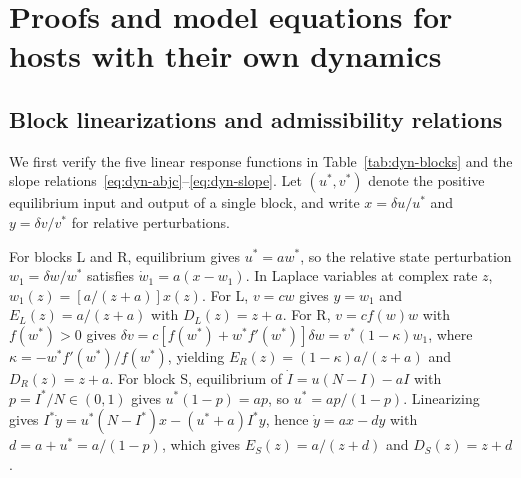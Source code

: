 \section{Proofs and model equations for hosts with their own dynamics}\label{app:dyn}

\subsection{Block linearizations and admissibility relations}\label{subsec:app-dyn-blocks}

We first verify the five linear response functions in Table~\ref{tab:dyn-blocks} and the slope relations~\eqref{eq:dyn-abjc}--\eqref{eq:dyn-slope}. Let $(u^*, v^*)$ denote the positive equilibrium input and output of a single block, and write $x = \delta u / u^*$ and $y = \delta v / v^*$ for relative perturbations.

For blocks L and R, equilibrium gives $u^* = a w^*$, so the relative state perturbation $w_1 = \delta w / w^*$ satisfies $\dot{w}_1 = a(x - w_1)$. In Laplace variables at complex rate $z$, $w_1(z) = [a/(z + a)]x(z)$. For L, $v = cw$ gives $y = w_1$ and $E_L(z) = a/(z + a)$ with $D_L(z) = z + a$. For R, $v = cf(w)w$ with $f(w^*) > 0$ gives $\delta v = c[f(w^*) + w^* f'(w^*)]\delta w = v^*(1 - \kappa)w_1$, where $\kappa = -w^* f'(w^*)/f(w^*)$, yielding $E_R(z) = (1 - \kappa)a/(z + a)$ and $D_R(z) = z + a$. For block S, equilibrium of $\dot{I} = u(N - I) - aI$ with $p = I^*/N \in (0, 1)$ gives $u^*(1 - p) = ap$, so $u^* = ap/(1 - p)$. Linearizing gives $I^* \dot{y} = u^*(N - I^*)x - (u^* + a)I^* y$, hence $\dot{y} = ax - dy$ with $d = a + u^* = a/(1 - p)$, which gives $E_S(z) = a/(z + d)$ and $D_S(z) = z + d$.

